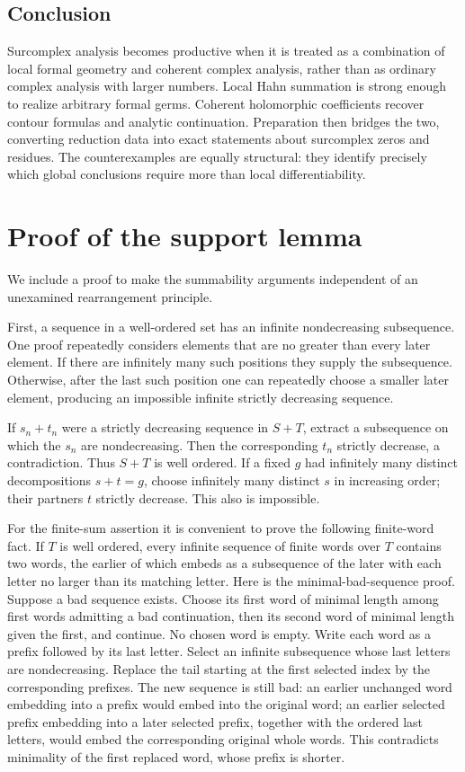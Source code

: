 \documentclass[11pt,a4paper]{article}
\numberwithin{equation}{section}
\theoremstyle{definition}
\theoremstyle{remark}
\begin{document}
\subsection{Conclusion}
Surcomplex analysis becomes productive when it is treated as a combination of local formal geometry and coherent complex analysis, rather than as ordinary complex analysis with larger numbers. Local Hahn summation is strong enough to realize arbitrary formal germs. Coherent holomorphic coefficients recover contour formulas and analytic continuation. Preparation then bridges the two, converting reduction data into exact statements about surcomplex zeros and residues. The counterexamples are equally structural: they identify precisely which global conclusions require more than local differentiability.

\appendix
\section{Proof of the support lemma}
\label{app:neumann}
We include a proof to make the summability arguments independent of an unexamined rearrangement principle.

First, a sequence in a well-ordered set has an infinite nondecreasing subsequence. One proof repeatedly considers elements that are no greater than every later element. If there are infinitely many such positions they supply the subsequence. Otherwise, after the last such position one can repeatedly choose a smaller later element, producing an impossible infinite strictly decreasing sequence.

If $s_n+t_n$ were a strictly decreasing sequence in $S+T$, extract a subsequence on which the $s_n$ are nondecreasing. Then the corresponding $t_n$ strictly decrease, a contradiction. Thus $S+T$ is well ordered. If a fixed $g$ had infinitely many distinct decompositions $s+t=g$, choose infinitely many distinct $s$ in increasing order; their partners $t$ strictly decrease. This also is impossible.

For the finite-sum assertion it is convenient to prove the following finite-word fact. If $T$ is well ordered, every infinite sequence of finite words over $T$ contains two words, the earlier of which embeds as a subsequence of the later with each letter no larger than its matching letter. Here is the minimal-bad-sequence proof. Suppose a bad sequence exists. Choose its first word of minimal length among first words admitting a bad continuation, then its second word of minimal length given the first, and continue. No chosen word is empty. Write each word as a prefix followed by its last letter. Select an infinite subsequence whose last letters are nondecreasing. Replace the tail starting at the first selected index by the corresponding prefixes. The new sequence is still bad: an earlier unchanged word embedding into a prefix would embed into the original word; an earlier selected prefix embedding into a later selected prefix, together with the ordered last letters, would embed the corresponding original whole words. This contradicts minimality of the first replaced word, whose prefix is shorter.
\end{document}
